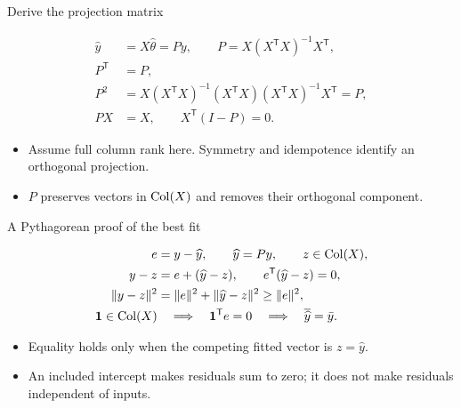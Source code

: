 \begin{frame}{Derive the projection matrix}
\begin{definitionbox}
\[
\begin{aligned}
\widehat y&=X\widehat\theta=Py,
\qquad P=X(X^{\mathsf T}X)^{-1}X^{\mathsf T},\\
P^{\mathsf T}&=P,\\
P^2&=X(X^{\mathsf T}X)^{-1}(X^{\mathsf T}X)
(X^{\mathsf T}X)^{-1}X^{\mathsf T}=P,\\
PX&=X,\qquad X^{\mathsf T}(I-P)=0.
\end{aligned}
\]
\end{definitionbox}
\small
\begin{itemize}\setlength{\itemsep}{7pt}
\item Assume full column rank here. Symmetry and idempotence identify an orthogonal projection.
\item $P$ preserves vectors in $\operatorname{Col}(X)$ and removes their orthogonal component.
\end{itemize}
\end{frame}

\begin{frame}{A Pythagorean proof of the best fit}
\begin{definitionbox}
\[
\begin{aligned}
e&=y-\widehat y,\qquad \widehat y=Py,\qquad z\in\operatorname{Col}(X),\\
y-z&=e+(\widehat y-z),\qquad e^{\mathsf T}(\widehat y-z)=0,\\
\lVert y-z\rVert^2&=\lVert e\rVert^2+\lVert\widehat y-z\rVert^2
\ge\lVert e\rVert^2,\\
\mathbf1\in\operatorname{Col}(X)&\quad\Longrightarrow\quad
\mathbf1^{\mathsf T}e=0\quad\Longrightarrow\quad
\overline{\widehat y}=\bar y.
\end{aligned}
\]
\end{definitionbox}
\small
\begin{itemize}\setlength{\itemsep}{7pt}
\item Equality holds only when the competing fitted vector is $z=\widehat y$.
\item An included intercept makes residuals sum to zero; it does not make residuals independent of inputs.
\end{itemize}
\end{frame}



